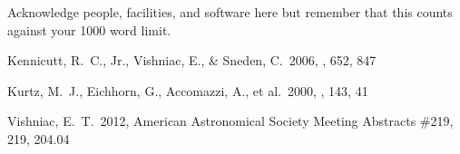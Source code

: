 \documentclass[RNAAS]{aastex62}
\begin{document}
\acknowledgments

Acknowledge people, facilities, and software here but remember that this counts
against your 1000 word limit.

\begin{thebibliography}{}

 Kennicutt, R.~C., Jr., Vishniac, E., \& Sneden, C.\ 2006, \apj, 652, 847 

 Kurtz, M.~J., Eichhorn, G., Accomazzi, A., et al.\ 2000, \aaps, 143, 41 

 Vishniac, E.~T.\ 2012, American Astronomical Society Meeting Abstracts \#219, 219, 204.04 

\end{thebibliography}
\end{document}
